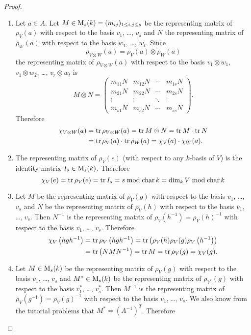 \begin{proof}
\begin{enumerate}[label=\emph{\alph*})]
  \item
   Let $a \in A$. Let $M \in \operatorname{M}_s(k) = (m_{ij})_{1 \leq i,j \leq s}$ be the representing matrix of $\rho_V(a)$ with respect to the basis $v_1$, \dots, $v_s$ and $N$ the representing matrix of $\rho_W(a)$ with respect to the basis $w_1$, \dots, $w_t$. Since
   \[
    \rho_{V \otimes W}(a) = \rho_V(a) \otimes \rho_W(a)
   \]
   the representing matrix of $\rho_{V \otimes W}(a)$ with respect to the basis $v_1 \otimes w_1$, $v_1 \otimes w_2$, \dots, $v_r \otimes w_t$ is
   \[
    M \otimes N =
    \begin{pmatrix}
     m_{11} N & m_{12} N & \cdots & m_{1s} N \\
     m_{21} N & m_{22} N & \cdots & m_{2s} N \\
     \vdots   & \vdots   & \ddots & \vdots   \\
     m_{s1} N & m_{s2} N & \cdots & m_{ss} N
    \end{pmatrix}.
   \]
   Therefore
   \begin{align*}
    \chi_{V \otimes W}(a)
    &= \operatorname{tr} \rho_{V \otimes W}(a)
    = \operatorname{tr} M \otimes N
    = \operatorname{tr} M \cdot \operatorname{tr} N \\
    &= \operatorname{tr} \rho_V(a) \cdot \operatorname{tr} \rho_W(a)
    = \chi_V(a) \cdot \chi_W(a).
   \end{align*}
  \item
   The representing matrix of $\rho_V(e)$ (with respect to any $k$-basis of $V$) is the identity matrix $I_s \in \operatorname{M}_s(k)$. Therefore
   \[
    \chi_V(e) = \operatorname{tr} \rho_V(e) = \operatorname{tr} I_s = s \bmod \operatorname{char} k = \dim_k V \bmod \operatorname{char} k
   \]
  \item
   Let $M$ be the representing matrix of $\rho_V(g)$ with respect to the basis $v_1$, \dots, $v_s$ and $N$ be the representing matrix of $\rho_V(h)$ with respect to the basis $v_1$, \dots, $v_s$. Then $N^{-1}$ is the representing matrix of $\rho_V(h^{-1}) = \rho_V(h)^{-1}$ with respect to the basis $v_1$, \dots, $v_s$. Therefore
   \begin{align*}
    \chi_V\left( hgh^{-1} \right)
    &= \operatorname{tr} \rho_V\left( hgh^{-1} \right)
    = \operatorname{tr}\left( \rho_V(h) \rho_V(g) \rho_V\left( h^{-1} \right) \right) \\
    &= \operatorname{tr}\left( NMN^{-1} \right)
    = \operatorname{tr} M
    = \operatorname{tr} \rho_V(g)
    = \chi_V(g).
   \end{align*}
  \item
   Let $M \in \operatorname{M}_s(k)$ be the representing matrix of $\rho_V(g)$ with respect to the basis $v_1$, \dots, $v_s$ and $M^* \in \operatorname{M}_s(k)$ be the representing matrix of $\rho_{V^*}(g)$ with respect to the basis $v_1^*$, \dots, $v_s^*$. Then $M^{-1}$ is the representing matrix of $\rho_V(g^{-1}) = \rho_V(g)^{-1}$ with respect to the basis $v_1$, \dots, $v_s$. We also know from the tutorial problems that $M^* = \left(A^{-1}\right)^T$. Therefore

\end{enumerate}
\end{proof}
